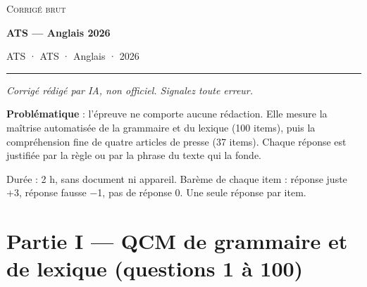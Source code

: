 \documentclass[11pt,a4paper]{article}
\begin{document}
\thispagestyle{plain}
\begin{center}
  {\small\scshape Corrigé brut}\par\smallskip
  {\LARGE\bfseries ATS — Anglais 2026\par}\medskip
  {\large ATS · ATS · Anglais · 2026\par}
\end{center}
\vspace{2pt}\hrule\vspace{8pt}

\emph{Corrigé rédigé par IA, non officiel. Signalez toute erreur.}

\textbf{Problématique} : l'épreuve ne comporte aucune rédaction. Elle mesure la maîtrise automatisée de la grammaire et du lexique (100 items), puis la compréhension fine de quatre articles de presse (37 items). Chaque réponse est justifiée par la règle ou par la phrase du texte qui la fonde.

Durée : 2 h, sans document ni appareil. Barème de chaque item : réponse juste +3, réponse fausse −1, pas de réponse 0. Une seule réponse par item.

\hypertarget{partie-i-qcm-de-grammaire-et-de-lexique-questions-1-uxe0-100}{%
\section{Partie I --- QCM de grammaire et de lexique (questions 1 à 100)}\label{partie-i-qcm-de-grammaire-et-de-lexique-questions-1-uxe0-100}}
\end{document}
